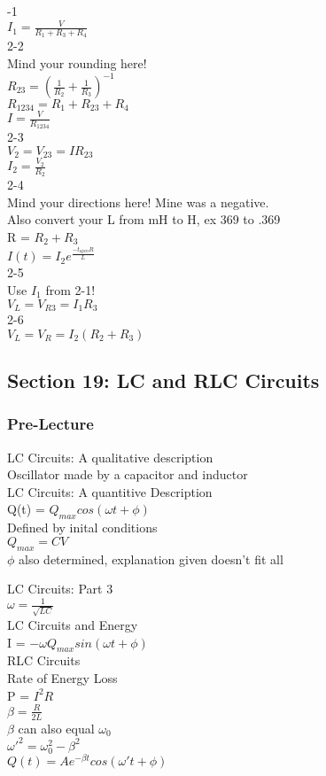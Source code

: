\documentclass{article}
\begin{document}
-1 \\
$I_1 = \frac{V}{R_1 + R_3 + R_4}$ \\
2-2 \\
Mind your rounding here! \\
$R_{23} = (\frac{1}{R_2} + \frac{1}{R_3})^{-1}$ \\
$R_{1234} = R_1 + R_{23} + R_4$ \\
$I = \frac{V}{R_{1234}}$ \\
2-3 \\
$V_2 = V_{23} = I R_{23}$ \\
$I_2 = \frac{V_2}{R_2}$ \\
2-4 \\
Mind your directions here! Mine was a negative. \\
Also convert your L from mH to H, ex 369 to .369 \\
R = $R_2 + R_3$ \\
$I(t) = I_2 e ^{\frac{-t_{open}R}{L}}$ \\
2-5 \\
Use $I_1$ from 2-1! \\
$V_L = V_{R3} = I_1 R_3$ \\
2-6 \\
$V_L = V_R = I_2 (R_2 + R_3)$


\subsection{Section 19: LC and RLC Circuits}
\subsubsection{Pre-Lecture}
\noindent
LC Circuits: A qualitative description \\
Oscillator made by a capacitor and inductor \\
LC Circuits: A quantitive Description \\
Q(t) = $Q_{max} cos(\omega t + \phi)$ \\
Defined by inital conditions \\
$Q_{max} = CV$ \\
$\phi$ also determined, explanation given doesn't fit all 

\vspace{2mm}

\noindent 
LC Circuits: Part 3 \\
$\omega = \frac{1}{\sqrt{LC}}$ \\
LC Circuits and Energy \\
I = $-\omega Q_{max} sin(\omega t + \phi)$ \\
RLC Circuits \\
Rate of Energy Loss \\
P = $I^2 R$ \\
$\beta = \frac{R}{2L} $ \\
$\beta$ can also equal $\omega_0$ \\
$\omega'^2 = \omega_0^2 - \beta^2$ \\
$Q(t) = Ae^{-\beta t} cos(\omega' t + \phi) $
\end{document}

